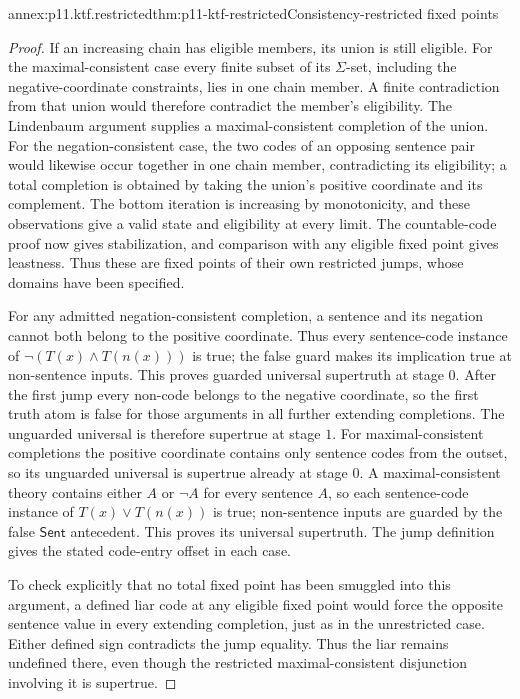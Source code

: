 \begin{annexitem}{annex:p11.ktf.restricted}{thm:p11-ktf-restricted}{Consistency-restricted fixed points}
\begin{proof}
If an increasing chain has eligible members, its union is still eligible.
For the maximal-consistent case every finite subset of its
\(\Sigma\)-set, including the negative-coordinate constraints, lies
in one chain member. A finite contradiction from that union would
therefore contradict the member's eligibility. The Lindenbaum argument
supplies a maximal-consistent completion of the union. For the
negation-consistent case, the two codes of an opposing sentence pair
would likewise occur together in one chain member, contradicting its
eligibility; a total completion is obtained by taking the union's
positive coordinate and its complement. The bottom iteration is
increasing by monotonicity, and
these observations give a valid state and eligibility at every limit.
The countable-code proof now gives stabilization, and comparison with
any eligible fixed point gives leastness. Thus these are fixed points
of their own restricted jumps, whose domains have been specified.

For any admitted negation-consistent completion, a sentence and its
negation cannot both belong to the positive coordinate. Thus every
sentence-code instance of \(\neg(T(x)\land T(n(x)))\) is true;
the false guard makes its implication true at non-sentence inputs.
This proves guarded universal supertruth at stage \(0\). After the
first jump every non-code belongs to the negative coordinate, so the
first truth atom is false for those arguments in all further extending
completions. The unguarded universal is therefore supertrue at stage
\(1\). For maximal-consistent completions the positive coordinate
contains only sentence codes from the outset, so its unguarded
universal is supertrue already at stage \(0\).
A maximal-consistent theory contains either \(A\) or
\(\neg A\) for every sentence \(A\), so each sentence-code
instance of \(T(x)\lor T(n(x))\) is true; non-sentence inputs are
guarded by the false \(\mathsf{Sent}\) antecedent. This proves its
universal supertruth. The jump definition gives the stated code-entry
offset in each case.

To check explicitly that no total fixed point has been smuggled into
this argument, a defined liar code at any eligible fixed point would
force the opposite sentence value in every extending completion, just
as in the unrestricted case. Either defined sign contradicts the jump
equality. Thus the liar remains undefined there, even though the
restricted maximal-consistent disjunction involving it is supertrue.
\end{proof}
\end{annexitem}

